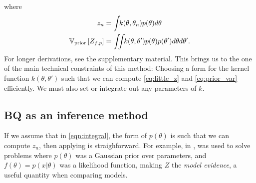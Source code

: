 where 
\begin{align}
z_n & = \int\!\! k(\theta, \theta_n) p(\theta) d\theta \label{eq:little_z}\\
\mathbb{V}_{\textrm{prior}} \left[ {Z_{f,p}} \right] &  = \int\!\!\! \int\!\! k(\theta, \theta') p(\theta) p(\theta') d\theta d\theta' \label{eq:prior_var}.
\end{align}
For longer derivations, see the supplementary material.  This brings us to the one of the main technical constraints of this method:  Choosing a form for the kernel function $k(\theta, \theta')$ such that we can compute \eqref{eq:little_z} and \eqref{eq:prior_var} efficiently.  We must also set or integrate out any parameters of $k$.
%


\subsection{BQ as an inference method}

If we assume that in \eqref{eqn:integral}, the form of $p(\theta)$ is such that we can compute $z_n$, then applying \bq{} is straighforward.  For example, in \cite{BZMonteCarlo}, \bq{} was used to solve problems where $p(\theta)$ was a Gaussian prior over parameters, and $f(\theta) = p( x | \theta )$ was a likelihood function, making $Z$ the \emph{model evidence}, a useful quantity when comparing models.

